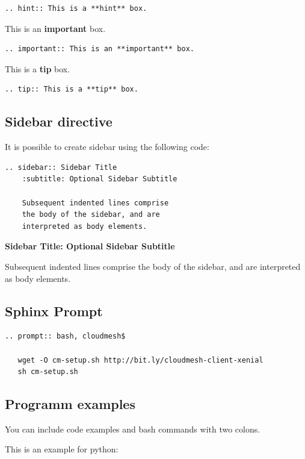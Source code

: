 \begin{verbatim}
.. hint:: This is a **hint** box.
\end{verbatim}

This is an \textbf{important} box.

\begin{verbatim}
.. important:: This is an **important** box.
\end{verbatim}

This is a \textbf{tip} box.

\begin{verbatim}
.. tip:: This is a **tip** box.
\end{verbatim}

\subsection{Sidebar directive}\label{sidebar-directive}

It is possible to create sidebar using the following code:

\begin{verbatim}
.. sidebar:: Sidebar Title
    :subtitle: Optional Sidebar Subtitle

    Subsequent indented lines comprise
    the body of the sidebar, and are
    interpreted as body elements.
\end{verbatim}

\textbf{Sidebar Title: Optional Sidebar Subtitle}

Subsequent indented lines comprise the body of the sidebar, and are
interpreted as body elements.

\subsection{Sphinx Prompt}\label{sphinx-prompt}

\begin{verbatim}
.. prompt:: bash, cloudmesh$

   wget -O cm-setup.sh http://bit.ly/cloudmesh-client-xenial
   sh cm-setup.sh
\end{verbatim}

\subsection{Programm examples}\label{programm-examples}

You can include code examples and bash commands with two colons.

This is an example for python:

